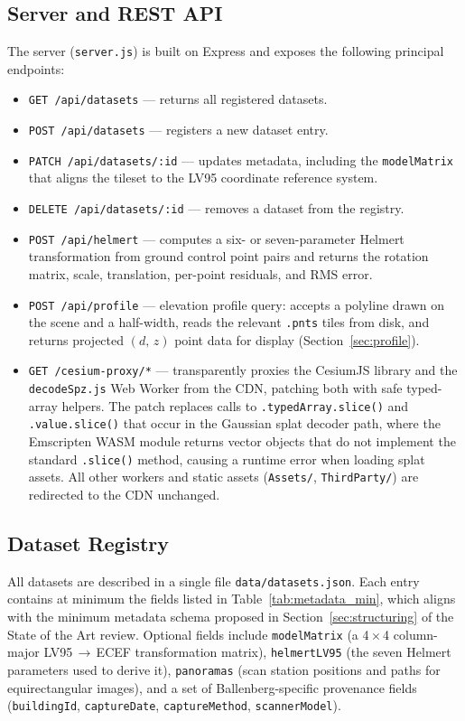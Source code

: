 \subsection{Server and REST API}

The server (\texttt{server.js}) is built on Express and exposes the following
principal endpoints:

\begin{itemize}
  \item \texttt{GET /api/datasets} — returns all registered datasets.
  \item \texttt{POST /api/datasets} — registers a new dataset entry.
  \item \texttt{PATCH /api/datasets/:id} — updates metadata, including the
    \texttt{modelMatrix} that aligns the tileset to the LV95 coordinate
    reference system.
  \item \texttt{DELETE /api/datasets/:id} — removes a dataset from the
    registry.
  \item \texttt{POST /api/helmert} — computes a six- or seven-parameter
    Helmert transformation from ground control point pairs and returns the
    rotation matrix, scale, translation, per-point residuals, and RMS error.
  \item \texttt{POST /api/profile} — elevation profile query: accepts a polyline
    drawn on the scene and a half-width, reads the relevant \texttt{.pnts} tiles
    from disk, and returns projected $(d,\,z)$ point data for display
    (Section~\ref{sec:profile}).
  \item \texttt{GET /cesium-proxy/*} — transparently proxies the CesiumJS
    library and the \texttt{decodeSpz.js} Web Worker from the CDN, patching
    both with safe typed-array helpers. The patch replaces calls to
    \texttt{.typedArray.slice()} and \texttt{.value.slice()} that occur in
    the Gaussian splat decoder path, where the Emscripten WASM module returns
    vector objects that do not implement the standard \texttt{.slice()} method,
    causing a runtime error when loading splat assets. All other workers and
    static assets (\texttt{Assets/}, \texttt{ThirdParty/}) are redirected to
    the CDN unchanged.
\end{itemize}

\subsection{Dataset Registry}

All datasets are described in a single file \texttt{data/datasets.json}. Each
entry contains at minimum the fields listed in Table~\ref{tab:metadata_min},
which aligns with the minimum metadata schema proposed in
Section~\ref{sec:structuring} of the State of the Art review. Optional fields
include \texttt{modelMatrix} (a 4\,$\times$\,4 column-major LV95\,$\to$\,ECEF
transformation matrix), \texttt{helmertLV95} (the seven Helmert parameters
used to derive it), \texttt{panoramas} (scan station positions and paths for
equirectangular images), and a set of Ballenberg-specific provenance fields
(\texttt{buildingId}, \texttt{captureDate}, \texttt{captureMethod},
\texttt{scannerModel}).

